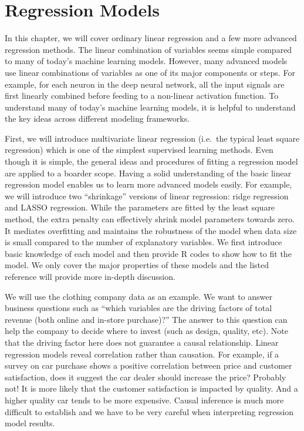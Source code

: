 \documentclass[
  12pt,
]{krantz}
\begin{document}
\hypertarget{regression-models}{%
\chapter{Regression Models}\label{regression-models}}

In this chapter, we will cover ordinary linear regression and a few more advanced regression methods. The linear combination of variables seems simple compared to many of today's machine learning models. However, many advanced models use linear combinations of variables as one of its major components or steps. For example, for each neuron in the deep neural network, all the input signals are first linearly combined before feeding to a non-linear activation function. To understand many of today's machine learning models, it is helpful to understand the key ideas across different modeling frameworks.

First, we will introduce multivariate linear regression (i.e.~the typical least square regression) which is one of the simplest supervised learning methods. Even though it is simple, the general ideas and procedures of fitting a regression model are applied to a boarder scope. Having a solid understanding of the basic linear regression model enables us to learn more advanced models easily. For example, we will introduce two ``shrinkage'' versions of linear regression: ridge regression and LASSO regression. While the parameters are fitted by the least square method, the extra penalty can effectively shrink model parameters towards zero. It mediates overfitting and maintains the robustness of the model when data size is small compared to the number of explanatory variables. We first introduce basic knowledge of each model and then provide R codes to show how to fit the model. We only cover the major properties of these models and the listed reference will provide more in-depth discussion.

We will use the clothing company data as an example. We want to answer business questions such as ``which variables are the driving factors of total revenue (both online and in-store purchase)?'' The answer to this question can help the company to decide where to invest (such as design, quality, etc). Note that the driving factor here does not guarantee a causal relationship. Linear regression models reveal correlation rather than causation. For example, if a survey on car purchase shows a positive correlation between price and customer satisfaction, does it suggest the car dealer should increase the price? Probably not! It is more likely that the customer satisfaction is impacted by quality. And a higher quality car tends to be more expensive. Causal inference is much more difficult to establish and we have to be very careful when interpreting regression model results.
\end{document}
